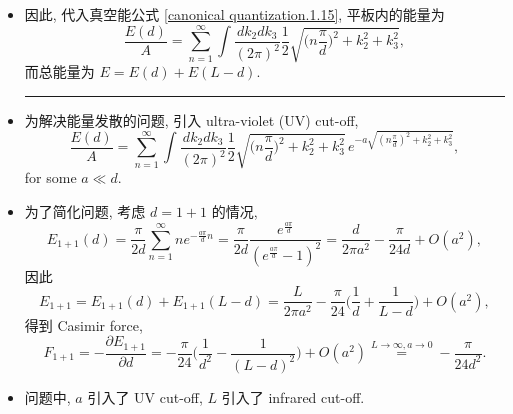 \begin{itemize}
	\item 因此, 代入真空能公式 \eqref{canonical quantization.1.15}, 平板内的能量为
	\begin{equation}
		\frac{E(d)}{A} = \sum_{n = 1}^\infty \int \frac{dk_2 dk_3}{(2 \pi)^2} \frac{1}{2} \sqrt{\Big( n \frac{\pi}{d} \Big)^2 + k_2^2 + k_3^2},
	\end{equation}
	而总能量为 $E = E(d) + E(L - d)$.
	
	\noindent\rule[0.5ex]{\linewidth}{0.5pt} %
	
	\item 为解决能量发散的问题, 引入 ultra-violet (UV) cut-off,
	\begin{equation}
		\frac{E(d)}{A} = \sum_{n = 1}^\infty \int \frac{dk_2 dk_3}{(2 \pi)^2} \frac{1}{2} \sqrt{\Big( n \frac{\pi}{d} \Big)^2 + k_2^2 + k_3^2} \, e^{- a \sqrt{(n \frac{\pi}{d})^2 + k_2^2 + k_3^2}},
	\end{equation}
	for some $a \ll d$.
	
	\item 为了简化问题, 考虑 $d = 1 + 1$ 的情况,
	\begin{equation}
		E_{1 + 1}(d) = \frac{\pi}{2 d} \sum_{n = 1}^\infty n e^{- \frac{a \pi}{d} n} = \frac{\pi}{2 d} \frac{e^{\frac{a \pi}{d}}}{(e^{\frac{a \pi}{d}} - 1)^2} = \frac{d}{2 \pi a^2} - \frac{\pi}{24 d} + O(a^2),
	\end{equation}
	因此
	\begin{equation}
		E_{1 + 1} = E_{1 + 1}(d) + E_{1 + 1}(L - d) = \frac{L}{2 \pi a^2} - \frac{\pi}{24} \Big( \frac{1}{d} + \frac{1}{L - d} \Big) + O(a^2),
	\end{equation}
	得到 Casimir force,
	\begin{equation}
		F_{1 + 1} = - \frac{\partial E_{1 + 1}}{\partial d} = - \frac{\pi}{24} \Big( \frac{1}{d^2} - \frac{1}{(L - d)^2} \Big) + O(a^2) \overset{L \rightarrow \infty, a \rightarrow 0}{=} - \frac{\pi}{24 d^2}.
	\end{equation}
	
	\item 问题中, $a$ 引入了 UV cut-off, $L$ 引入了 infrared cut-off.
\end{itemize}
